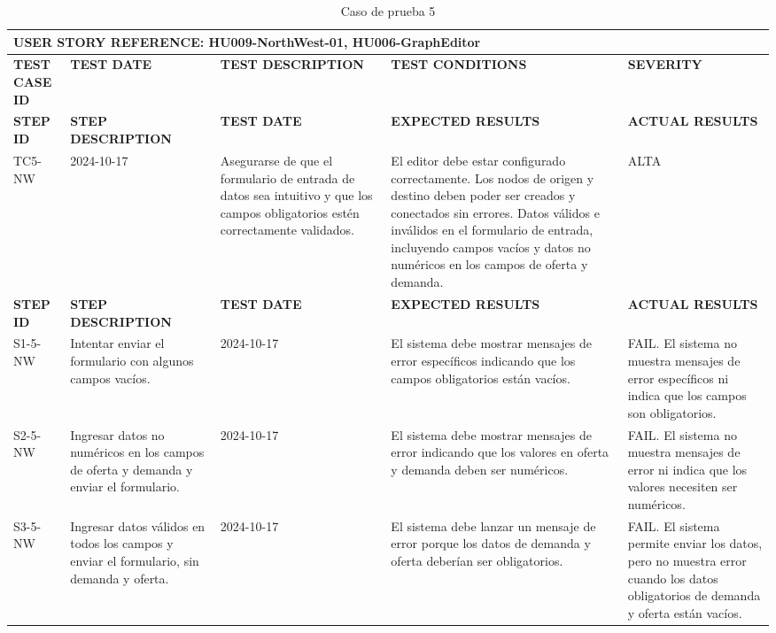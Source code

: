 \begin{longtable}{|p{2cm}|p{3cm}|p{3cm}|p{3cm}|p{3cm}|}
    \caption{Caso de prueba 5} \label{tab:casos_prueba5} \\
    \hline
    \multicolumn{5}{|l|}{\textbf{USER STORY REFERENCE: HU009-NorthWest-01, HU006-GraphEditor}} \\ \hline
    \textbf{TEST CASE ID} & \textbf{TEST DATE} & \textbf{TEST DESCRIPTION} & \textbf{TEST CONDITIONS} & \textbf{SEVERITY} \\ \hline
    \endfirsthead
    \hline
    \textbf{STEP ID} & \textbf{STEP DESCRIPTION} & \textbf{TEST DATE} & \textbf{EXPECTED RESULTS} & \textbf{ACTUAL RESULTS} \\ \hline
    \endhead
    TC5-NW & 2024-10-17 & Asegurarse de que el formulario de entrada de datos sea intuitivo y que los campos obligatorios estén correctamente validados. & El editor debe estar configurado correctamente. Los nodos de origen y destino deben poder ser creados y conectados sin errores. Datos válidos e inválidos en el formulario de entrada, incluyendo campos vacíos y datos no numéricos en los campos de oferta y demanda. & ALTA \\ \hline
    \textbf{STEP ID} & \textbf{STEP DESCRIPTION} & \textbf{TEST DATE} & \textbf{EXPECTED RESULTS} & \textbf{ACTUAL RESULTS} \\ \hline
    S1-5-NW & Intentar enviar el formulario con algunos campos vacíos. & 2024-10-17 & El sistema debe mostrar mensajes de error específicos indicando que los campos obligatorios están vacíos. & FAIL. El sistema no muestra mensajes de error específicos ni indica que los campos son obligatorios. \\ \hline
    S2-5-NW & Ingresar datos no numéricos en los campos de oferta y demanda y enviar el formulario. & 2024-10-17 & El sistema debe mostrar mensajes de error indicando que los valores en oferta y demanda deben ser numéricos. & FAIL. El sistema no muestra mensajes de error ni indica que los valores necesiten ser numéricos. \\ \hline
    S3-5-NW & Ingresar datos válidos en todos los campos y enviar el formulario, sin demanda y oferta. & 2024-10-17 & El sistema debe lanzar un mensaje de error porque los datos de demanda y oferta deberían ser obligatorios. & FAIL. El sistema permite enviar los datos, pero no muestra error cuando los datos obligatorios de demanda y oferta están vacíos. \\ \hline
\end{longtable}

